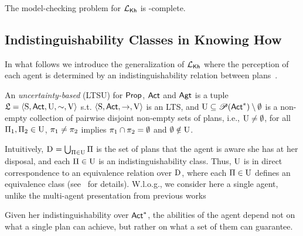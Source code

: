 \begin{proposition}
    The model-checking problem for $\mathcal{L}_{{\mathsf{Kh}}}$ is \PSPACE-complete.
\end{proposition}

\subsection{Indistinguishability Classes in Knowing How}

In what follows we introduce the generalization of $\mathcal{L}_{{\mathsf{Kh}}}$ where the perception of each agent is determined by an indistinguishability relation between plans~\cite{AFSVQ21,AFSVQ23}. 

\begin{definition}\label{def:ults}
    An \emph{uncertainty-based \lts} (LTSU) for ${\rm \sf Prop}$, ${\rm \sf Act}$ and ${\rm \sf Agt}$ is a tuple     $\mathfrak{L}=\langle{\operatorname{S},{\rm \sf Act},\operatorname{U},\sim,\operatorname{V}}\rangle$ s.t. $\langle{\operatorname{S},{\rm \sf Act},\rightarrow,\operatorname{V}}\rangle$ is an LTS, and 
    $\operatorname{U}\subseteq \mathscr{P}({\rm \sf Act}^*)\setminus \emptyset$ is a non-empty collection of pairwise disjoint non-empty sets of plans, i.e., $\operatorname{U}\neq\emptyset$, for all $\Pi_1,\Pi_2\in\operatorname{U}$, $\pi_1\neq\pi_2$ implies  $\pi_1\cap\pi_2=\emptyset$ and $\emptyset\notin\operatorname{U}$. 

    \end{definition}
    
    Intuitively, $\operatorname{D}_{} = \bigcup_{\Pi \in \operatorname{U}} \Pi$ is the set of plans that the  agent is aware she has at her disposal, and each $\Pi \in \operatorname{U}$ is an indistinguishability class. Thus, $\operatorname{U}$ is in direct correspondence to an equivalence relation over $\operatorname{D}_{}$, where each $\Pi\in\operatorname{U}$ defines an equivalence class (see~\cite{AFSVQ21,AFSVQ23} for details). W.l.o.g., we consider here a single agent, unlike the multi-agent presentation from previous works
    
    Given her indistinguishability over ${\rm \sf Act}^*$, the abilities of the agent depend not on what a single plan can achieve, but rather on what a set of them can guarantee.
    
